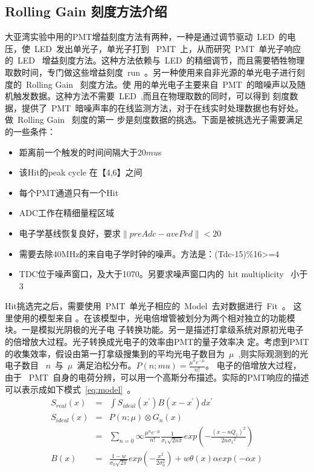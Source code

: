 \subsection{Rolling Gain 刻度方法介绍}
大亚湾实验中用的PMT增益刻度方法有两种，一种是通过调节驱动~LED~的电压，使~LED~发出单光子，单光子打到
~PMT~上，从而研究~PMT~单光子响应的~LED~ 增益刻度方法。这种方法依赖与~LED~的精细调节，而且需要牺牲物理
取数时间，专门做这些增益刻度~run~。另一种使用来自非光源的单光电子进行刻度的~Rolling Gain~ 刻度方法。使
用的单光电子主要来自~PMT~的暗噪声以及随机触发数据。这种方法不需要~LED~,而且在物理取数的同时，可以得到
刻度数据，提供了~PMT~暗噪声率的在线监测方法，对于在线实时处理数据也有好处。做~Rolling Gain~ 刻度的第一
步是刻度数据的挑选。下面是被挑选光子需要满足的一些条件：
\begin{itemize}
\item 距离前一个触发的时间间隔大于20$mu$s
\item 该Hit的peak cycle 在【4,6】之间
\item 每个PMT通道只有一个Hit
\item ADC工作在精细量程区域
\item 电子学基线恢复良好，要求$ \left \| preAdc-avePed \right \| <20 $
\item 需要去除40MHz的来自电子学时钟的噪声。方法是：(Tdc-15)\%16>=4
\item TDC位于噪声窗口，及大于1070。另要求噪声窗口内的~hit multiplicity~ 小于3
\end{itemize}
Hit挑选完之后，需要使用~PMT~单光子相应的~Model~去对数据进行~Fit~。 这里使用的模型来自
\citep{bellamy1994absolute}。在该模型中，光电倍增管被划分为两个相对独立的功能模块。一是模拟光阴极的光子电
子转换功能。另一是描述打拿级系统对原初光电子的倍增放大过程。光子转换成光电子的效率由PMT的量子效率决
 定。考虑到PMT 的收集效率，假设由第一打拿级搜集到的平均光电子数目为~$\mu$~,则实际观测到的光电子数目
 ~$n$~与~$\mu$~满足泊松分布。$P(n;mu)=\frac{\mu^{n}e^{-\mu}}{n!}$。 电子的倍增放大过程，由于
 ~PMT~自身的电荷分辨，可以用一个高斯分布描述。实际的PMT响应的描述可以表示成如下模式~\ref{eq:model}~。
 \begin{eqnarray} \label{eq:model}
 S_{real}(x) &=& \int S_{ideal}(x^{\prime})B(x-x^{\prime})dx^{\prime}\\
 S_{ideal}(x) &=& P(n;\mu)\otimes G_n(x) \nonumber \\
 &=& \sum_{n=0}{\infty} \frac{{\mu}^n e^{-\mu}}{n!}\frac{1}{\sigma_1\sqrt{2n\pi}}exp(-\frac{{(x-nQ_1)}^2}{2n{\sigma_1}^2}) \\
B(x)&=&\frac{1-w}{\sigma_0\sqrt{2\pi}}exp(-\frac{x^2}{2\sigma_0^2})+w\theta (x) \alpha exp(-\alpha x ) \end{eqnarray} 
